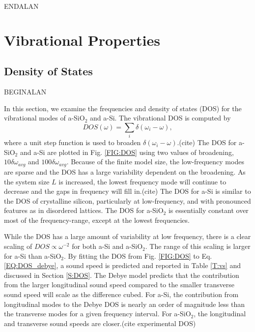 \documentclass[aps,prb,onecolumn,preprint,superscriptaddress,footinbib,amsmath,amssymb,floatfix]{revtex4}
\begin{document}
ENDALAN

\section{\label{S:Vibrational}Vibrational Properties}

\subsection{\label{S:DOS}Density of States}

BEGINALAN

In this section, we examine the frequencies and density of states (DOS)  
for the vibrational modes of a-SiO$_2$ and a-Si. 
The vibrational DOS is computed by 
\begin{equation}\label{EQ:DOS}
DOS(\omega) = \sum_i \delta(\omega_i - \omega),
\end{equation}
where a unit step function is used to broaden 
$\delta(\omega_i - \omega)$.(cite)  
The DOS for a-SiO$_2$ and a-Si are plotted in Fig. \ref{FIG:DOS} 
using two values of 
broadening, $10\delta\omega_{avg}$ and $100\delta\omega_{avg}$.  
Because of the finite model size, the low-frequency modes are sparse and 
the DOS has a large variability dependent on the broadening.
\cite{feldman_numerical_1999} 
As the system size $L$ is increased, the lowest frequency mode will 
continue to decrease and the gaps in frequency will fill in.(cite)  
The DOS for a-Si is similar to the 
DOS of crystalline silicon,
\cite{williams_numerical_1985,donadio_atomistic_2009} particularly 
at low-frequency, and with pronounced features as in disordered lattices.
\cite{larkin_predicting_2013,beltukov_ioffe-regel_2013} The DOS for 
a-SiO$_2$ is essentially constant over most of the frequency-range, 
except at the lowest frequencies. 

While the DOS has a large amount of variability at low frequency, 
there is a clear scaling of $DOS \propto \omega^{-2}$ for both 
a-Si and a-SiO$_2$. The range of this 
scaling is larger for a-Si than a-SiO$_2$. 
By fitting the DOS 
from Fig. \ref{FIG:DOS} to Eq. \eqref{EQ:DOS_debye}, 
a sound speed is predicted and 
reported in Table \ref{T:vs} and discussed in Section \ref{S:DOS}. 
The Debye model predicts 
that the contribution from the larger longitudinal sound speed 
compared to the smaller transverse sound speed will scale as the 
difference cubed. For a-Si, 
the contribution from longitudinal modes to the Debye DOS is nearly 
an order of magnitude less than the transverse modes for a given 
frequency interval. For a-SiO$_2$, the longitudinal and transverse 
sound speeds are closer.(cite experimental DOS) 
\end{document}
